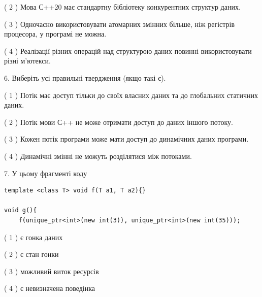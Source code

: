 \documentclass[12pt, ukrainian]{article}
\begin{document}
\begin {large}
{( 2 ) Мова С++20 має стандартну бібліотеку конкурентних структур даних.%

( 3 ) Одночасно використовувати атомарних змінних більше, ніж регістрів процесора, у програмі не можна.%

( 4 ) Реалізації різних операцій над структурою даних повинні використовувати різні м’ютекси.%
\newpage



\vspace{5mm}
6. Виберіть усі правильні твердження (якщо такі є).\par
\vspace{2mm}

( 1 ) Потік має доступ тільки до своїх власних даних та до глобальних статичних даних.%

( 2 ) Потік мови С++ не може отримати доступ до даних іншого потоку.%

( 3 ) Кожен потік програми може мати доступ до динамічних даних програми.%

( 4 ) Динамічні змінні не можуть розділятися між потоками.%


\vspace{5mm}
7. У цьому фрагменті коду
\begin{verbatim}
template <class T> void f(T a1, T a2){}

void g(){
    f(unique_ptr<int>(new int(3)), unique_ptr<int>(new int(35)));
\end{verbatim}

( 1 ) є гонка даних%

( 2 ) є стан гонки%

( 3 ) можливий виток ресурсів%

( 4 ) є невизначена поведінка%
}
\end {large}
\end{document}
